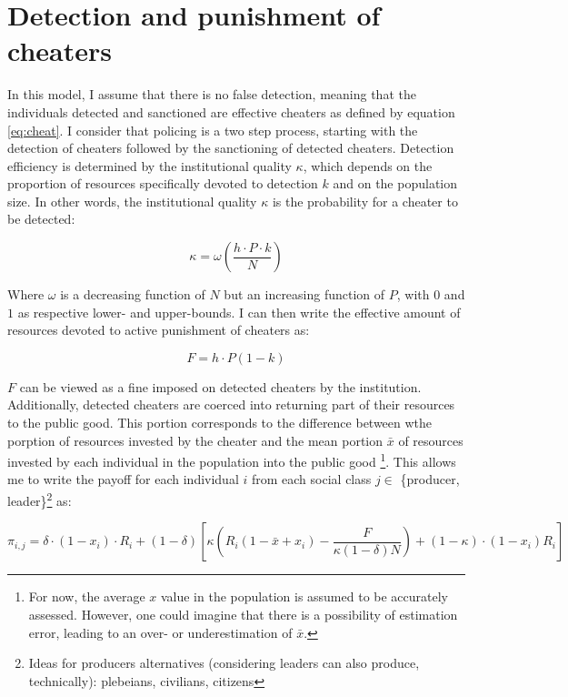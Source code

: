 \documentclass[a4paper]{article}
\begin{document}
\section{Detection and punishment of cheaters}
\label{sec:cheat}

In this model, I assume that there is no false detection, meaning that the individuals detected and sanctioned are effective cheaters as defined by equation \ref{eq:cheat}. I consider that policing is a two step process, starting with the detection of cheaters followed by the sanctioning of detected cheaters. Detection efficiency is determined by the institutional quality $\kappa$, which depends on the proportion of resources specifically devoted to detection $k$ and on the population size. In other words, the institutional quality $\kappa$ is the probability for a cheater to be detected:

\begin{equation}
\kappa=\omega\left(\frac{h\cdot P\cdot k}{N}\right)
\end{equation} 

Where $\omega$ is a decreasing function of $N$ but an increasing function of $P$, with $0$ and $1$ as respective lower- and upper-bounds. I can then write the effective amount of resources devoted to active punishment of cheaters as:

\begin{equation}
F=h\cdot P\left(1-k\right)
\end{equation}

$F$ can be viewed as a fine imposed on detected cheaters by the institution. Additionally, detected cheaters are coerced into returning part of their resources to the public good. This portion corresponds to the difference between wthe porption of resources invested by the cheater and the mean portion $\bar{x}$ of resources invested by each individual in the population into the public good \footnote{For now, the average $x$ value in the population is assumed to be accurately assessed. However, one could imagine that there is a possibility of estimation error, leading to an over- or underestimation of $\bar{x}$.}. This allows me to write the payoff for each individual $i$ from each social class $j\in$ \{producer, leader\}\footnote{Ideas for producers alternatives (considering leaders can also produce, technically): plebeians, civilians, citizens} as:

\begin{equation}
\pi_{i,j}=\delta\cdot(1-x_i)\cdot R_i+\left(1-\delta\right)\left[\kappa\left(R_i\left(1-\bar{x}+x_i\right)-\frac{F}{\kappa\left(1-\delta\right)N}\right)+\left(1-\kappa\right)\cdot(1-x_i)R_i\right] 
\end{equation}
\end{document}
